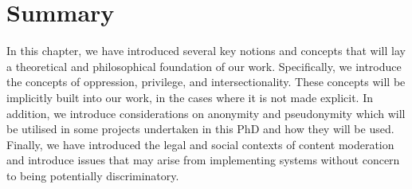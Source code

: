 %
%
%
%


\section{Summary}
In this chapter, we have introduced several key notions and concepts that will lay a theoretical and philosophical foundation of our work. Specifically, we introduce the concepts of oppression, privilege, and intersectionality. These concepts will be implicitly built into our work, in the cases where it is not made explicit. In addition, we introduce considerations on anonymity and pseudonymity which will be utilised in some projects undertaken in this PhD and how they will be used. Finally, we have introduced the legal and social contexts of content moderation and introduce issues that may arise from implementing systems without concern to being potentially discriminatory.
